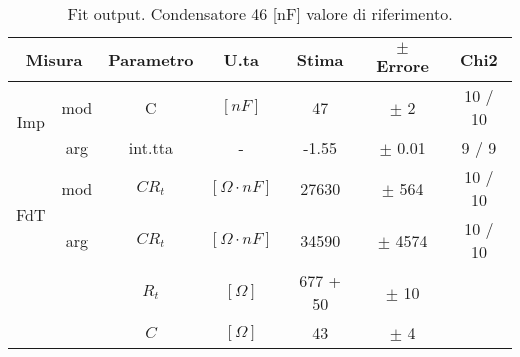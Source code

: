 \begin{table}[H]
\begin{center}
\begin{tabular}{|c|c|c|c|c|c|c|}
\hline

\multicolumn{2}{|c|}{Misura}  & Parametro   & U.ta & Stima & $\pm$ Errore & Chi2     \\ \hline

\multirow{ 2}{*}{Imp}
& mod & C  & $[nF]$     
&   47 & $\pm$    2 &  10 / 10    \\

& arg & int.tta & - 
& -1.55 & $\pm$ 0.01 &  9 / 9      \\ \hline


\multirow{ 2}{*}{FdT}
& mod & $CR_{t}$ & $[\Omega\cdot nF]$ 
& 27630  & $\pm$ 564 & 10 / 10      \\

& arg & $CR_{t}$ & $[\Omega\cdot nF]$ 
& 34590  & $\pm$ 4574 & 10 / 10      \\

\multicolumn{2}{|c|}{}  & $R_{t}$ & $[\Omega]$  
& 677 + 50  & $\pm$  10 &       \\

\multicolumn{2}{|c|}{}  & $C$ & $[\Omega]$  
& 43  & $\pm$  4 &       \\ \hline


\end{tabular}

\label{C3_P1_fit_cond2}

\caption{
Fit output. Condensatore 46 [nF] valore di riferimento. }

\end{center}

\end{table}